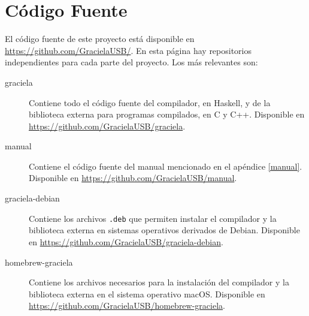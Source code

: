 \chapter{Código Fuente}
\label{source}

El código fuente de este proyecto está disponible en
\url{https://github.com/GracielaUSB/}. En esta página hay repositorios
independientes para cada parte del proyecto. Los más relevantes son:

\begin{description}
  \item[graciela] Contiene todo el código fuente del compilador, en Haskell, y de la biblioteca externa para programas compilados, en C y C++. Disponible en \url{https://github.com/GracielaUSB/graciela}.
  \item[manual] Contiene el código fuente del manual mencionado en el apéndice \ref{manual}. Disponible en \url{https://github.com/GracielaUSB/manual}.
  \item[graciela-debian] Contiene los archivos \texttt{.deb} que permiten instalar el compilador y la biblioteca externa en sistemas operativos derivados de Debian. Disponible en \url{https://github.com/GracielaUSB/graciela-debian}.
  \item[homebrew-graciela] Contiene los archivos necesarios para la instalación del compilador y la biblioteca externa en el sistema operativo macOS. Disponible en \url{https://github.com/GracielaUSB/homebrew-graciela}.
\end{description}

